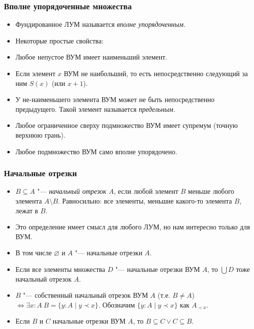 \documentclass[10pt]{beamer}
\begin{document}
\begin{frame}
    \frametitle{Вполне упорядоченные множества}
    \begin{itemize}
        \item Фундированное ЛУМ называется \emph{вполне упорядоченным}.
        \item Некоторые простые свойства:
        \item Любое непустое ВУМ имеет наименьший элемент.
        \item Если элемент $x$ ВУМ не наибольший, то есть непосредственно следующий за ним $S(x)$ (или $x+1$).
        \item У не-наименьшего элемента ВУМ может не быть непосредственно предыдущего. Такой элемент называется \emph{предельным}.
        \item Любое ограниченное сверху подмножество ВУМ имеет супремум (точную верхнюю грань).
        \item Любое подмножество ВУМ само вполне упорядочено.
    \end{itemize}
\end{frame}

\begin{frame}
    \frametitle{Начальные отрезки}
    \begin{itemize}
        \item $B \subseteq A$ "--- \emph{начальный отрезок $A$}, если любой элемент $B$ меньше любого элемента $A \setminus B$. Равносильно: все элементы, меньшие какого-то элемента $B$, лежат в $B$.
        \item Это определение имеет смысл для любого ЛУМ, но нам интересно только для ВУМ.
        \item В том числе $\varnothing$ и $A$ "--- начальные отрезки $A$. 
        \item Если все элементы множества $D$ "--- начальные отрезки ВУМ $A$, то $\bigcup D$ тоже начальный отрезок $A$.
        \item $B$ "--- собственный начальный отрезок ВУМ $A$ (т.е. $B \neq A$) $\Leftrightarrow \exists x:A ~ B = \{y:A \mid y \prec x\}$. Обозначим $\{y:A \mid y \prec x\}$ как $A_{\prec x}$.
        \item Если $B$ и $C$ начальные отрезки ВУМ $A$, то $B \subseteq C \lor C \subseteq B$.
    \end{itemize}
\end{frame}

\end{document}
